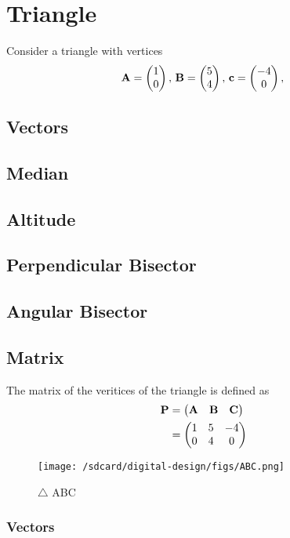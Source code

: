 \documentclass[11pt]{book}
\begin{document}
\frontmatter
\tableofcontents
\setcounter{page}{1}
\mainmatter
\chapter{Triangle}
Consider a triangle with vertices
\begin{align}
\label{eq:tri-pts}
\vec{A}=\myvec{1 \\ 0},\,
\vec{B}=\myvec{5\\4},\,
	\vec{c}=\myvec{-4\\0},\,
\end{align}

\section{Vectors}
\section{Median}
\section{Altitude}
\section{Perpendicular Bisector}
\section{Angular Bisector}
\section{Matrix}

The matrix of the veritices of the triangle is defined as
		\begin{align}
			\mathbf{P} &= \begin{pmatrix}\mathbf{A} & \mathbf{B} &\mathbf{C}\end{pmatrix} \\
            &=\begin{pmatrix}1 & 5 & -4 \\ 0 & 4 & 0\end{pmatrix}
		\end{align}
\begin{figure}[H]
    \centering
    \texttt{[image: /sdcard/digital-design/figs/ABC.png]}
    \caption{$\triangle$ ABC}
    \label{fig:mat_vec1}
\end{figure}
\subsection{Vectors}
\end{document}
